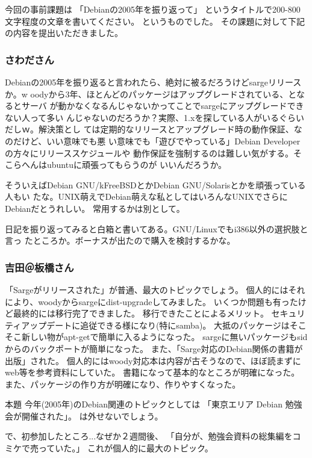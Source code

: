 \documentclass[mingoth,a4paper]{jsarticle}
\begin{document}
今回の事前課題は
「Debianの2005年を振り返って」
というタイトルで200-800文字程度の文章を書いてください。
というものでした。
その課題に対して下記の内容を提出いただきました。

\subsubsection{さわださん}

Debianの2005年を振り返ると言われたら、絶対に被るだろうけどsargeリリースか。w
oodyから3年、ほとんどのパッケージはアップグレードされている、となるとサーバ
が動かなくなるんじゃないかってことでsargeにアップグレードできない人って多い
んじゃないのだろうか？実際、1.xを探している人がいるぐらいだしｗ。解決策とし
ては定期的なリリースとアップグレード時の動作保証、なのだけど、いい意味でも悪
い意味でも「遊びでやっている」Debian Developerの方々にリリーススケジュールや
動作保証を強制するのは難しい気がする。そこらへんはubuntuに頑張ってもらうのが
いいんだろうか。

そういえばDebian GNU/kFreeBSDとかDebian GNU/Solarisとかを頑張っている人もい
たな。UNIX萌えでDebian萌えな私としてはいろんなUNIXでさらにDebianだとうれしい。
常用するかは別として。

日記を振り返ってみると白箱と書いてある。GNU/Linuxでもi386以外の選択肢と言っ
たところか。ボーナスが出たので購入を検討するかな。

\subsubsection{吉田＠板橋さん}

「Sargeがリリースされた」が普通、最大のトピックでしょう。
個人的にはそれにより、woodyからsargeにdist-upgradeしてみました。
いくつか問題も有ったけど最終的には移行完了できました。
移行できたことによるメリット。
セキュリティアップデートに追従できる様になり(特にsamba)。
大抵のパッケージはそこそこ新しい物がapt-getで簡単に入るようになった。
sargeに無いパッケージもsidからのバックポートが簡単になった。
また、「Sarge対応のDebian関係の書籍が出版」された。
個人的にはwoody対応本は内容が古そうなので、ほぼ読まずに
web等を参考資料にしていた。
書籍になって基本的なところが明確になった。
また、パッケージの作り方が明確になり、作りやすくなった。

本題
今年(2005年)のDebian関連のトピックとしては
「東京エリア Debian 勉強会が開催された」。
は外せないでしょう。

で、初参加したところ...なぜか２週間後、
「自分が、勉強会資料の総集編をコミケで売っていた。」
これが個人的に最大のトピック。
\end{document}
